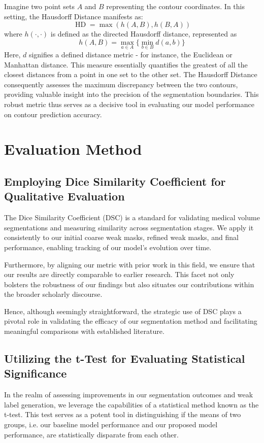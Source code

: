 Imagine two point sets \(A\) and \(B\) representing the contour coordinates. In this setting, the Hausdorff Distance manifests as:
\[
\operatorname*{HD} = \max \left(h\left(A, B\right), h\left(B, A\right)\right)
\]
where \(h(\cdot, \cdot)\) is defined as the directed Hausdorff distance, represented as
\[
h(A, B) = \max_{a \in A}\{ \min_{b \in B} d(a, b) \}
\]
Here, \(d\) signifies a defined distance metric - for instance, the Euclidean or Manhattan distance. This measure essentially quantifies the greatest of all the closest distances from a point in one set to the other set. The Hausdorff Distance consequently assesses the maximum discrepancy between the two contours, providing valuable insight into the precision of the segmentation boundaries. This robust metric thus serves as a decisive tool in evaluating our model performance on contour prediction accuracy.
\section{Evaluation Method}
\subsection{Employing Dice Similarity Coefficient for Qualitative Evaluation}
The Dice Similarity Coefficient (DSC) is a standard for validating medical volume segmentations and measuring similarity across segmentation stages. We apply it consistently to our initial coarse weak masks, refined weak masks, and final performance, enabling tracking of our model's evolution over time.

Furthermore, by aligning our metric with prior work in this field, we ensure that our results are directly comparable to earlier research. This facet not only bolsters the robustness of our findings but also situates our contributions within the broader scholarly discourse.

Hence, although seemingly straightforward, the strategic use of DSC plays a pivotal role in validating the efficacy of our segmentation method and facilitating meaningful comparisons with established literature.
\subsection{Utilizing the t-Test for Evaluating Statistical Significance}
In the realm of assessing improvements in our segmentation outcomes and weak label generation, we leverage the capabilities of a statistical method known as the t-test. This test serves as a potent tool in distinguishing if the means of two groups, i.e. our baseline model performance and our proposed model performance, are statistically disparate from each other.

